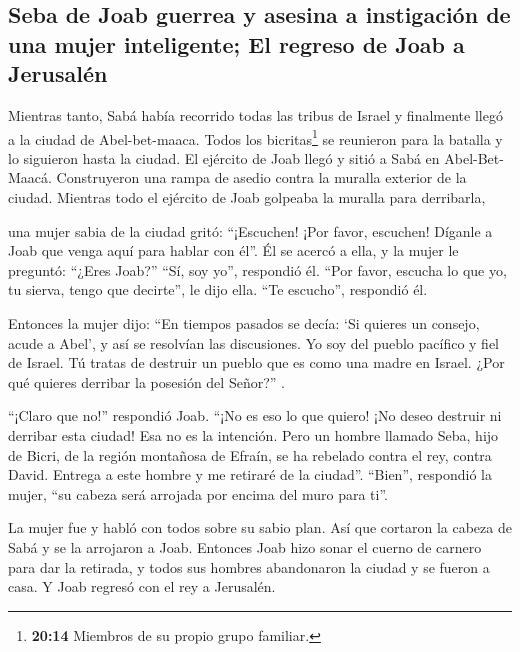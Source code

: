 \hypertarget{seba-de-joab-guerrea-y-asesina-a-instigaciuxf3n-de-una-mujer-inteligente-el-regreso-de-joab-a-jerusaluxe9n}{%
\subsection{Seba de Joab guerrea y asesina a instigación de una mujer
inteligente; El regreso de Joab a
Jerusalén}\label{seba-de-joab-guerrea-y-asesina-a-instigaciuxf3n-de-una-mujer-inteligente-el-regreso-de-joab-a-jerusaluxe9n}}

 Mientras tanto, Sabá había recorrido todas las tribus de
Israel y finalmente llegó a la ciudad de Abel-bet-maaca. Todos los
bicritas\footnote{\textbf{20:14} Miembros de su propio grupo familiar.}
se reunieron para la batalla y lo siguieron hasta la ciudad.
 El ejército de Joab llegó y sitió a Sabá en
Abel-Bet-Maacá. Construyeron una rampa de asedio contra la muralla
exterior de la ciudad. Mientras todo el ejército de Joab golpeaba la
muralla para derribarla,

 una mujer sabia de la ciudad gritó: ``¡Escuchen! ¡Por
favor, escuchen! Díganle a Joab que venga aquí para hablar con él''.
 Él se acercó a ella, y la mujer le preguntó: ``¿Eres
Joab?'' ``Sí, soy yo'', respondió él. ``Por favor, escucha lo que yo, tu
sierva, tengo que decirte'', le dijo ella. ``Te escucho'', respondió él.

 Entonces la mujer dijo: ``En tiempos pasados se decía:
`Si quieres un consejo, acude a Abel', y así se resolvían las
discusiones.  Yo soy del pueblo pacífico y fiel de
Israel. Tú tratas de destruir un pueblo que es como una madre en Israel.
¿Por qué quieres derribar la posesión del Señor?'' .

 ``¡Claro que no!'' respondió Joab. ``¡No es eso lo que
quiero! ¡No deseo destruir ni derribar esta ciudad!  Esa
no es la intención. Pero un hombre llamado Seba, hijo de Bicri, de la
región montañosa de Efraín, se ha rebelado contra el rey, contra David.
Entrega a este hombre y me retiraré de la ciudad''. ``Bien'', respondió
la mujer, ``su cabeza será arrojada por encima del muro para ti''.

 La mujer fue y habló con todos sobre su sabio plan. Así
que cortaron la cabeza de Sabá y se la arrojaron a Joab. Entonces Joab
hizo sonar el cuerno de carnero para dar la retirada, y todos sus
hombres abandonaron la ciudad y se fueron a casa. Y Joab regresó con el
rey a Jerusalén.

